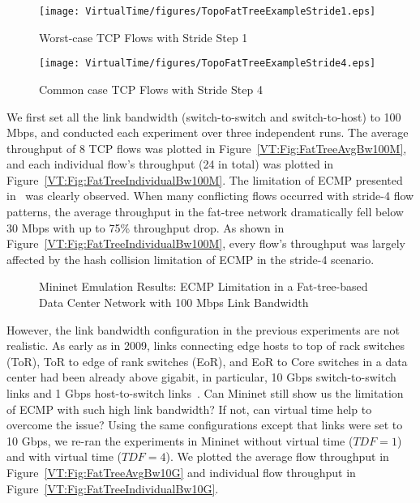 \begin{figure}[ht]
\centering
\texttt{[image: VirtualTime/figures/TopoFatTreeExampleStride1.eps]}
\caption{Worst-case TCP Flows with Stride Step 1}
\label{VT:Fig:FattreeTopoExampleStride1}
\end{figure}

\begin{figure}[ht]
\centering
\texttt{[image: VirtualTime/figures/TopoFatTreeExampleStride4.eps]}
\caption{Common case TCP Flows with Stride Step 4}
\label{VT:Fig:FattreeTopoExampleStride4}
\end{figure}

We first set all the link bandwidth (switch-to-switch and switch-to-host) to 100 Mbps,
and conducted each experiment over three independent runs.
The average throughput of 8 TCP flows was plotted in Figure~\ref{VT:Fig:FatTreeAvgBw100M},
and each individual flow's throughput (24 in total) was plotted in Figure~\ref{VT:Fig:FatTreeIndividualBw100M}.
The limitation of ECMP presented in~\cite{Hedera} was clearly observed.
When many conflicting flows occurred with stride-4 flow patterns,
the average throughput in the fat-tree network dramatically fell below 30 Mbps with up to 75\% throughput drop.
As shown in Figure~\ref{VT:Fig:FatTreeIndividualBw100M}, every flow's throughput was largely
affected by the hash collision limitation of ECMP in the stride-4 scenario.

\begin{figure}[ht]
\centering
\caption[Emulate ECMP with Low Link Bandwidth]{Mininet Emulation Results: ECMP Limitation in a Fat-tree-based Data Center Network with 100 Mbps Link Bandwidth}
\end{figure}

However, the link bandwidth configuration in the previous experiments are not realistic.
As early as in 2009, links connecting edge hosts to top of rack switches (ToR), ToR to edge of rank switches (EoR),
and EoR to Core switches in a data center had been already above gigabit,
in particular, 10 Gbps switch-to-switch links and 1 Gbps host-to-switch links~\cite{ScaleEffDCN}.
Can Mininet still show us the limitation of ECMP with such high link bandwidth?
If not, can virtual time help to overcome the issue?
Using the same configurations except that links were set to 10 Gbps,
we re-ran the experiments in Mininet without virtual time ($TDF=1$) and with virtual time ($TDF = 4$).
We plotted the average flow throughput in Figure~\ref{VT:Fig:FatTreeAvgBw10G} and
individual flow throughput in Figure~\ref{VT:Fig:FatTreeIndividualBw10G}.

